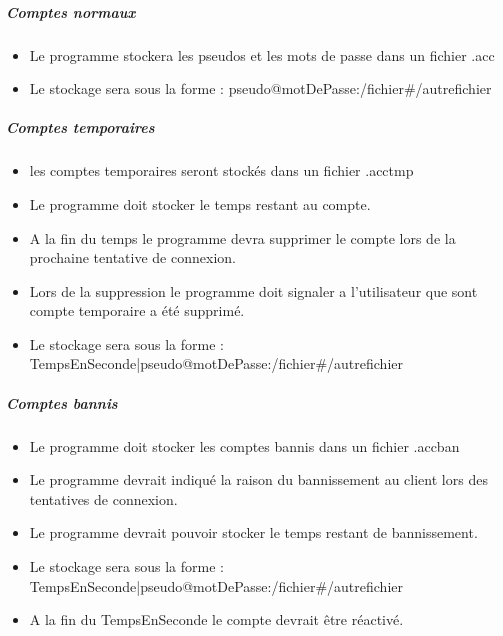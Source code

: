 \documentclass[10pt,a4paper]{report}
\begin{document}
	\subparagraph{Comptes normaux}
		\begin{itemize}[label = $\triangleright$]
			\item Le programme stockera les pseudos et les mots de passe dans un fichier .acc
			\item Le stockage sera sous la forme : pseudo@motDePasse:/fichier\#/autrefichier
		\end{itemize}
	\subparagraph{Comptes temporaires}
		\begin{itemize}[label = $\triangleright$]
			\item les comptes temporaires seront stockés dans un fichier .acctmp
			\item Le programme doit stocker le temps restant au compte.
			\item A la fin du temps le programme devra supprimer le compte lors de la prochaine tentative de connexion.
			\item Lors de la suppression le programme doit signaler a l'utilisateur que sont compte temporaire a été supprimé.
			\item Le stockage sera sous la forme : TempsEnSeconde|pseudo@motDePasse:/fichier\#/autrefichier
		\end{itemize}
	\subparagraph{Comptes bannis}
		\begin{itemize}[label = $\triangleright$]
			\item Le programme doit stocker les comptes bannis dans un fichier .accban
			\item Le programme devrait indiqué la raison du bannissement au client lors des tentatives de connexion.
			\item Le programme devrait pouvoir stocker le temps restant de bannissement.
			\item Le stockage sera sous la forme : TempsEnSeconde|pseudo@motDePasse:/fichier\#/autrefichier
			\item A la fin du TempsEnSeconde le compte devrait être réactivé.
		\end{itemize}
		

	
\end{document}
